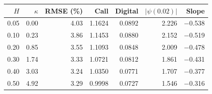 \begin{tabular}{rrrrrrr}
\toprule
$H$ & $\kappa$ & RMSE (\%) & Call & Digital & $|\psi(0.02)|$ & Slope\\
\midrule
0.05 & 0.00 & 4.03 & 1.1624 & 0.0892 & 2.226 & $-$0.538\\
0.10 & 0.23 & 3.86 & 1.1453 & 0.0880 & 2.152 & $-$0.519\\
0.20 & 0.85 & 3.55 & 1.1093 & 0.0848 & 2.009 & $-$0.478\\
0.30 & 1.74 & 3.33 & 1.0721 & 0.0812 & 1.861 & $-$0.431\\
0.40 & 3.03 & 3.24 & 1.0350 & 0.0771 & 1.707 & $-$0.377\\
0.50 & 4.92 & 3.29 & 0.9998 & 0.0727 & 1.546 & $-$0.316\\
\bottomrule
\end{tabular}
